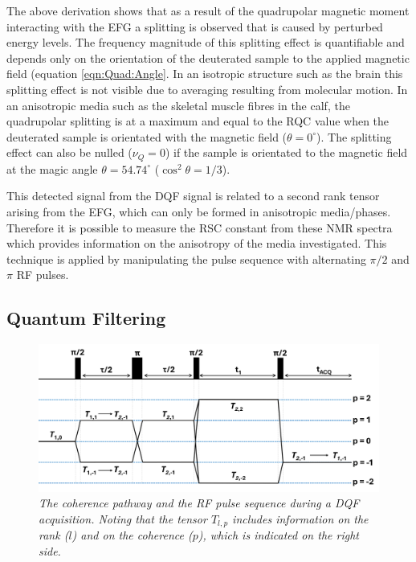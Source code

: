 \documentclass[class=article, crop=false]{standalone}
\begin{document}
The above derivation shows that as a result of the quadrupolar magnetic moment interacting with the EFG a splitting is observed that is caused by perturbed energy levels. The frequency magnitude of this splitting effect is quantifiable and depends only on the orientation of the deuterated sample to the applied magnetic field (equation \ref{eqn:Quad:Angle}. In an isotropic structure such as the brain this splitting effect is not visible due to averaging resulting from molecular motion. In an anisotropic media such as the skeletal muscle fibres in the calf, the quadrupolar splitting is at a maximum and equal to the RQC value when the deuterated sample is orientated with the magnetic field ($\theta = 0^\circ$). The splitting effect can also be nulled ($\nu_Q = 0$) if the sample is orientated to the magnetic field at the magic angle $\theta = 54.74^\circ$ ($\cos^2\theta=1/3$).

This detected signal from the DQF signal is related to a second rank tensor arising from the EFG, which can only be formed in anisotropic media/phases. Therefore it is possible to measure the RSC constant from these NMR spectra which provides information on the anisotropy of the media investigated. This technique is applied by manipulating the pulse sequence with alternating $\pi/2$ and $\pi$ RF pulses. 

\subsection{Quantum Filtering}

\begin{figure}
    \centering
    \includegraphics[width=1\textwidth]{Figures/Quad/DQF_Coherence.png}
    \caption{\textit{The coherence pathway and the RF pulse sequence during a DQF acquisition. Noting that the tensor $T_{l,p}$ includes information on the rank ($l$) and on the coherence ($p$), which is indicated on the right side.}}
    \label{fig:Quad:Coherence}
\end{figure}
\end{document}
